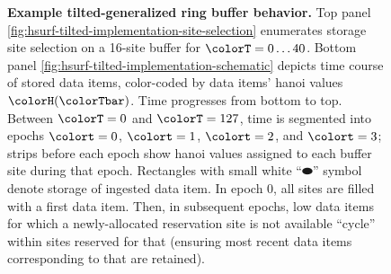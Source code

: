 \begin{figure}[htbp!]

\vspace{-2ex}\caption{%
  \textbf{Example tilted-generalized ring buffer behavior.}
  \footnotesize
  Top panel \ref{fig:hsurf-tilted-implementation-site-selection} enumerates storage site selection on a 16-site buffer for $\colorT=0 \ldots 40$.
  Bottom panel \ref{fig:hsurf-tilted-implementation-schematic} depicts time course of stored data items, color-coded by data items' hanoi values $\colorH(\colorTbar)$.
  Time progresses from bottom to top.
  Between $\colorT=0$ and $\colorT=127$, time is segmented into epochs $\colort=0$, $\colort=1$, $\colort=2$, and $\colort=3$; strips before each epoch show hanoi values assigned to each buffer site during that epoch.
  Rectangles with small white ``$\blkhorzoval$'' symbol denote storage of ingested data item.
  In epoch 0, all sites are filled with a first data item.
  Then, in subsequent epochs, low \hv{} data items for which a newly-allocated reservation site is not available ``cycle'' within sites reserved for that \hv{} (ensuring most recent data items corresponding to that \hv{} are retained).
}
\label{fig:hsurf-tilted-implementation}

\end{figure}
